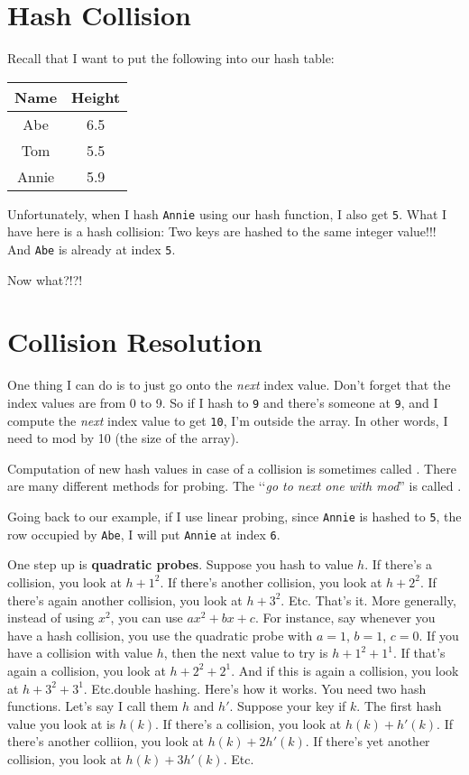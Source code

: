 \newpage
\section{Hash Collision}

Recall that I want to put the following into our hash table:
\begin{longtable}{|c|c|}
\hline
Name & Height \\
\hline
Abe &  6.5 \\
Tom &  5.5 \\
Annie &  5.9 \\
\hline
\end{longtable}
Unfortunately, when I hash \verb!Annie! using our
hash function, I also get \verb!5!.
What I have here is a hash collision:
Two keys are hashed to the same integer value!!!
And \verb!Abe! is already at index \verb!5!. 

Now what?!?!




\newpage
\section{Collision Resolution}

One thing I can do is to just go onto the \textit{next} index value.
Don't forget that the index values are from 0 to 9.
So if I hash to \verb!9! and there's someone at \verb!9!,
and I compute the \textit{next} index value to get \verb!10!,
I'm outside the array.
In other words, I need to mod by 10 (the size of the array).

Computation of new hash values in case of a collision is
sometimes called .
There are many different methods for probing.
The \lq\lq \textit{go to next one with mod}''
is called .

Going back to our example, if I use linear probing, since
\verb!Annie! is hashed to \verb!5!, the row occupied by \verb!Abe!,
I will put \verb!Annie! at index \verb!6!.



One step up is \textbf{quadratic probes}.
Suppose you hash to value $h$.
If there's a collision, you look at $h + 1^2$.
If there's another collision, you look at $h + 2^2$.
If there's again another collision, you look at $h + 3^2$.
Etc.
That's it.
More generally, instead of using $x^2$, you can 
use $ax^2 + bx + c$.
For instance, say whenever you have a hash collision,
you use
the quadratic probe with $a = 1$, $b = 1$, $c = 0$.
If you have a collision with value $h$, then
the next value to try is 
$h + 1^2 + 1^1$.
If that's again a collision, you look at 
$h + 2^2 + 2^1$.
And if this is again a collision, you look at
$h + 3^2 + 3^1$.
Etc.{double hashing}.
Here's how it works.
You need two hash functions.
Let's say I call them $h$ and $h'$.
Suppose your key if $k$.
The first hash value you look at is $h(k)$.
If there's a collision, you look at 
$h(k) + h'(k)$.
If there's another colliion, you look at
$h(k) + 2h'(k)$.
If there's yet another collision, you look at
$h(k) + 3h'(k)$.
Etc.


